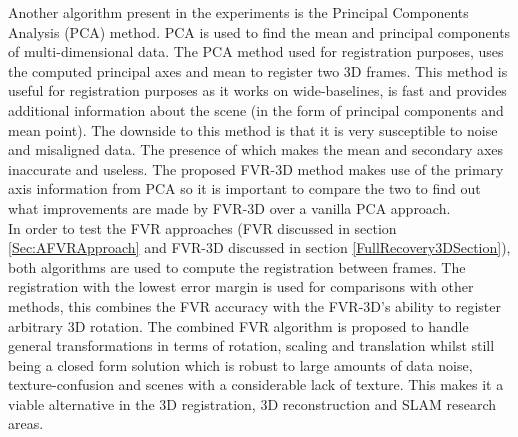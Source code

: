 Another algorithm present in the experiments is the Principal Components Analysis (PCA) method. PCA is used to find the mean and principal components of multi-dimensional data. The PCA method used for registration purposes, uses the computed principal axes and mean to register two 3D frames. This method is useful for registration purposes as it works on wide-baselines, is fast and provides additional information about the scene (in the form of principal components and mean point). The downside  to this method is that it is very susceptible to noise and misaligned data. The presence of which makes the mean and secondary axes inaccurate and useless. The proposed FVR-3D method makes use of the primary axis information from PCA so it is important to compare the two to find out what improvements are made by FVR-3D over a vanilla PCA approach. \\

In order to test the FVR approaches (FVR discussed in section \ref{Sec:AFVRApproach} and FVR-3D discussed in section \ref{FullRecovery3DSection}), both algorithms are used to compute the registration between frames. The registration with the lowest error margin is used for comparisons with other methods, this combines the FVR accuracy with the FVR-3D's ability to register arbitrary 3D rotation. The combined FVR algorithm is proposed to handle general transformations in terms of rotation, scaling and translation whilst still being a closed form solution which is robust to large amounts of data noise, texture-confusion and scenes with a considerable lack of texture. This makes it a viable alternative in the 3D registration, 3D reconstruction and SLAM research areas. \\
